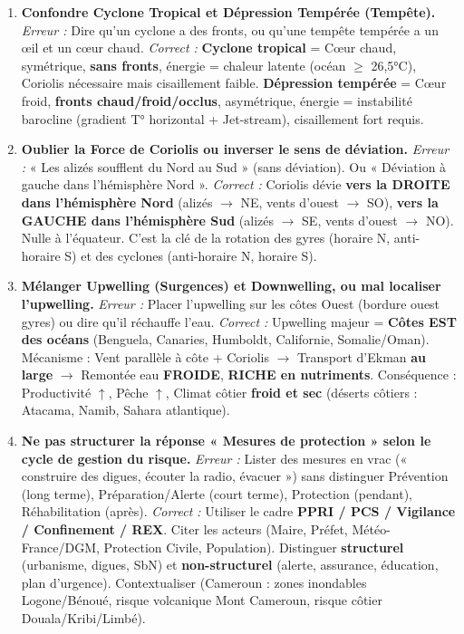 \documentclass[11pt]{article}
\begin{document}
\begin{attention}
\begin{enumerate}
    \item \textbf{Confondre Cyclone Tropical et Dépression Tempérée (Tempête).}
    \textit{Erreur :} Dire qu'un cyclone a des fronts, ou qu'une tempête tempérée a un œil et un cœur chaud.
    \textit{Correct :} \textbf{Cyclone tropical} = Cœur chaud, symétrique, \textbf{sans fronts}, énergie = chaleur latente (océan $\ge$ 26,5°C), Coriolis nécessaire mais cisaillement faible. \textbf{Dépression tempérée} = Cœur froid, \textbf{fronts chaud/froid/occlus}, asymétrique, énergie = instabilité barocline (gradient T° horizontal + Jet-stream), cisaillement fort requis.
    
    \item \textbf{Oublier la Force de Coriolis ou inverser le sens de déviation.}
    \textit{Erreur :} « Les alizés soufflent du Nord au Sud » (sans déviation). Ou « Déviation à gauche dans l'hémisphère Nord ».
    \textit{Correct :} Coriolis dévie \textbf{vers la DROITE dans l'hémisphère Nord} (alizés $\to$ NE, vents d'ouest $\to$ SO), \textbf{vers la GAUCHE dans l'hémisphère Sud} (alizés $\to$ SE, vents d'ouest $\to$ NO). Nulle à l'équateur. C'est la clé de la rotation des gyres (horaire N, anti-horaire S) et des cyclones (anti-horaire N, horaire S).
    
    \item \textbf{Mélanger Upwelling (Surgences) et Downwelling, ou mal localiser l'upwelling.}
    \textit{Erreur :} Placer l'upwelling sur les côtes Ouest (bordure ouest gyres) ou dire qu'il réchauffe l'eau.
    \textit{Correct :} Upwelling majeur = \textbf{Côtes EST des océans} (Benguela, Canaries, Humboldt, Californie, Somalie/Oman). Mécanisme : Vent parallèle à côte + Coriolis $\to$ Transport d'Ekman \textbf{au large} $\to$ Remontée eau \textbf{FROIDE}, \textbf{RICHE en nutriments}. Conséquence : Productivité $\uparrow$, Pêche $\uparrow$, Climat côtier \textbf{froid et sec} (déserts côtiers : Atacama, Namib, Sahara atlantique).
    
    \item \textbf{Ne pas structurer la réponse « Mesures de protection » selon le cycle de gestion du risque.}
    \textit{Erreur :} Lister des mesures en vrac (« construire des digues, écouter la radio, évacuer ») sans distinguer Prévention (long terme), Préparation/Alerte (court terme), Protection (pendant), Réhabilitation (après).
    \textit{Correct :} Utiliser le cadre \textbf{PPRI / PCS / Vigilance / Confinement / REX}. Citer les acteurs (Maire, Préfet, Météo-France/DGM, Protection Civile, Population). Distinguer \textbf{structurel} (urbanisme, digues, SbN) et \textbf{non-structurel} (alerte, assurance, éducation, plan d'urgence). Contextualiser (Cameroun : zones inondables Logone/Bénoué, risque volcanique Mont Cameroun, risque côtier Douala/Kribi/Limbé).
    

\end{enumerate}
\end{attention}
\end{document}
